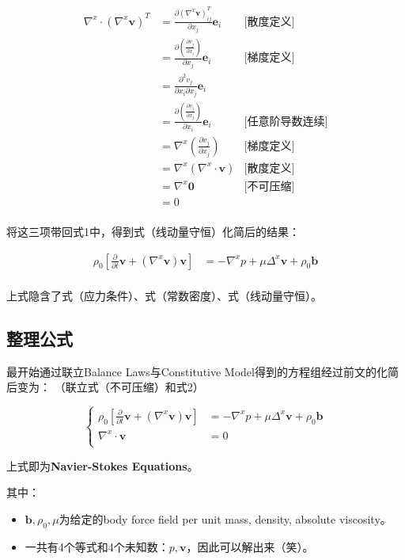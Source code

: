 \documentclass[lang=cn, a4paper,chinesefont=founder,bibend=bibtex]{elegantpaper}
\begin{document}
$$
\begin{aligned}
\nabla^x \cdot (\nabla^x\bm{v})^T 
&= \frac{\partial(\nabla^x \bm{v})^T_{ij}}{\partial x_j}\bm{e}_i & \text{[散度定义]} \\
&= \frac{\partial(\frac{\partial v_j}{\partial x_i})}{\partial x_j}\bm{e}_i  & \text{[梯度定义]} \\
&= \frac{\partial^2 v_j}{\partial x_i\partial x_j}\bm{e}_i  & \\
&= \frac{\partial(\frac{\partial v_j}{\partial x_j})}{\partial x_i}\bm{e}_i  & \text{[任意阶导数连续]} \\
&= \nabla^x(\frac{\partial v_j}{\partial x_j})  & \text{[梯度定义]} \\
&= \nabla^x(\nabla^x \cdot \bm{v})  & \text{[散度定义]} \\
&= \nabla^x\bm{0} & \text{[不可压缩]} \\
&= 0 & \\
\end{aligned}
$$

将这三项带回式1中，得到式（线动量守恒）化简后的结果：

\begin{equation}
	\begin{aligned}
		\rho_0 \left[\frac{\partial}{\partial t} \bm{v} + (\nabla^x \bm{v}) \bm{v} \right]
		&= -\nabla^xp + \mu \Delta^x\bm{v} + \rho_0 \bm{b} \\
	\end{aligned}
	\tag{2}
\end{equation}

上式隐含了式（应力条件）、式（常数密度）、式（线动量守恒）。


\subsection{整理公式}
最开始通过联立Balance Laws与Constitutive Model得到的方程组经过前文的化简后变为：
（联立式（不可压缩）和式2）

$$
\left\{
\begin{aligned}
\rho_0 \left[\frac{\partial}{\partial t} \bm{v} + (\nabla^x \bm{v}) \bm{v} \right]
&= -\nabla^xp + \mu \Delta^x\bm{v} + \rho_0 \bm{b} \\
\nabla^x\cdot \bm{v} &= 0 \\
\end{aligned}
\right.
$$

上式即为\textbf{Navier-Stokes Equations}。

其中：

\begin{itemize}
	\item $\bm{b}, \rho_0, \mu$为给定的body force field per unit mass, density, absolute viscosity。 
	\item 一共有4个等式和4个未知数：$p, \bm{v}$，因此可以解出来（笑）。
\end{itemize}















\nocite{*}
\printbibliography[heading=bibintoc, title=\ebibname]

\appendix
\addappheadtotoc
\end{document}
